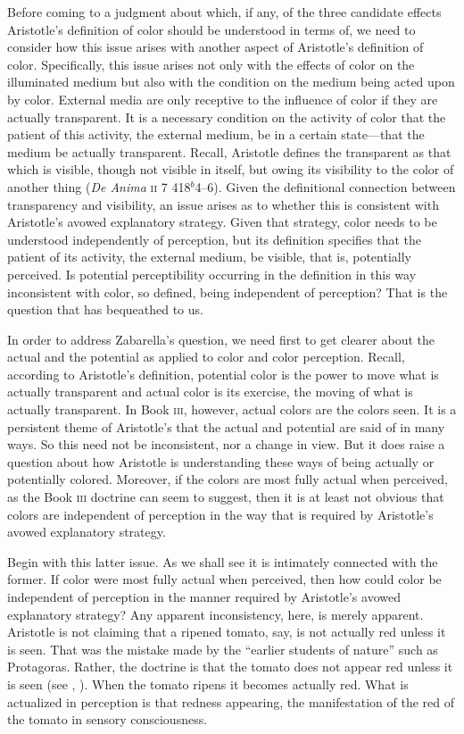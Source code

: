 Before coming to a judgment about which, if any, of the three candidate effects Aristotle's definition of color should be understood in terms of, we need to consider how this issue arises with another aspect of Aristotle's definition of color. Specifically, this issue arises not only with the effects of color on the illuminated medium but also with the condition on the medium being acted upon by color. External media are only receptive to the influence of color if they are actually transparent. It is a necessary condition on the activity of color that the patient of this activity, the external medium, be in a certain state---that the medium be actually transparent. Recall, Aristotle defines the transparent as that which is visible, though not visible in itself, but owing its visibility to the color of another thing (\emph{De Anima} \textsc{ii} 7 418\( ^{b} \)4--6). Given the definitional connection between transparency and visibility, an issue arises as to whether this is consistent with Aristotle's avowed explanatory strategy. Given that strategy, color needs to be understood independently of perception, but its definition specifies that the patient of its activity, the external medium, be visible, that is, potentially perceived. Is potential perceptibility occurring in the definition in this way inconsistent with color, so defined, being independent of perception? That is the question that \citet{Zabarella:1605kx} has bequeathed to us.

In order to address Zabarella's question, we need first to get clearer about the actual and the potential as applied to color and color perception. Recall, according to Aristotle's definition, potential color is the power to move what is actually transparent and actual color is its exercise, the moving of what is actually transparent. In Book \textsc{iii}, however, actual colors are the colors seen. It is a persistent theme of Aristotle's that the actual and potential are said of in many ways. So this need not be inconsistent, nor a change in view. But it does raise a question about how Aristotle is understanding these ways of being actually or potentially colored. Moreover, if the colors are most fully actual when perceived, as the Book \textsc{iii} doctrine can seem to suggest, then it is at least not obvious that colors are independent of perception in the way that is required by Aristotle's avowed explanatory strategy.

Begin with this latter issue. As we shall see it is intimately connected with the former. If color were most fully actual when perceived, then how could color be independent of perception in the manner required by Aristotle's avowed explanatory strategy? Any apparent inconsistency, here, is merely apparent. Aristotle is not claiming that a ripened tomato, say, is not actually red unless it is seen. That was the mistake made by the ``earlier students of nature'' such as Protagoras. Rather, the doctrine is that the tomato does not appear red unless it is seen (see \citealt[29]{Burnyeat:1982mz}, \citealt{Ganson:1997fk}). When the tomato ripens it becomes actually red. What is actualized in perception is that redness appearing, the manifestation of the red of the tomato in sensory consciousness. 

